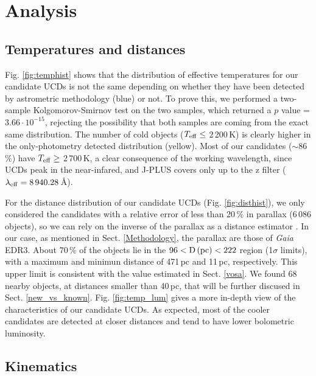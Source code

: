 
\section{Analysis} \label{Analysis}

\subsection{Temperatures and distances} \label{dist_temps}

Fig. \ref{fig:temphist} shows that the distribution of effective temperatures for our candidate UCDs is not the same depending on whether they have been detected by astrometric methodology (blue) or not. To prove this, we performed a two-sample Kolgomorov-Smirnov test on the two samples, which returned a $p$ value = 3.66\,$\cdot\,10^{-15}$, rejecting the possibility that both samples are coming from the exact same distribution. The number of cold objects ($T_{\rm eff}\leq$ 2\,200\,K) is clearly higher in the only-photometry detected distribution (yellow). Most of our candidates ($\sim$86\,\%) have $T_{\rm eff}\geq$ 2\,700\,K, a clear consequence of the working wavelength, since UCDs peak in the near-infared, and J-PLUS covers only up to the z filter ($\lambda_{\rm eff}=8\,940.28$\,\AA).


For the distance distribution of our candidate UCDs (Fig. \ref{fig:disthist}), we only considered the candidates with a relative error of less than 20\,\% in parallax (6\,086 objects), so we can rely on the inverse of the parallax as a distance estimator \citep{Luri2018}. In our case, as mentioned in Sect. \ref{Methodology}, the parallax are those of \textit{Gaia} EDR3. About 70\,\% of the objects lie in the $96 < {\rm D\,(pc)} < 222$ region (1$\sigma$ limits), with a maximum and minimun distance of 471\,pc and 11\,pc, respectively. This upper limit is consistent with the value estimated in Sect. \ref{vosa}. We found 68 nearby objects, at distances smaller than 40\,pc, that will be further discused in Sect. \ref{new_vs_known}. Fig. \ref{fig:temp_lum} gives a more in-depth view of the characteristics of our candidate UCDs. As expected, most of the cooler candidates are detected at closer distances and tend to have lower bolometric luminosity.


\subsection{Kinematics} \label{tangential_vel}

